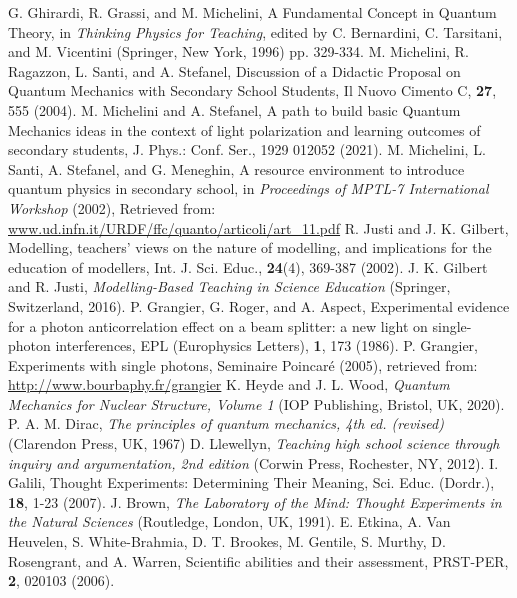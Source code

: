 \documentclass[twocolumn,secnumarabic,amssymb, nobibnotes, aps, prd, nofootinbib]{revtex4-2}
\begin{document}
\begin{thebibliography}{99}
 G. Ghirardi, R. Grassi, and M. Michelini, A Fundamental Concept in Quantum Theory, in \textit{Thinking Physics for Teaching}, edited by C. Bernardini, C. Tarsitani, and M. Vicentini (Springer, New York, 1996) pp. 329-334.
 M. Michelini, R. Ragazzon, L. Santi, and A. Stefanel, Discussion of a Didactic Proposal on Quantum Mechanics with Secondary School Students, Il Nuovo Cimento C, \textbf{27}, 555 (2004).
 M. Michelini and A. Stefanel, A path to build basic Quantum Mechanics ideas in the context of light polarization and learning outcomes of secondary students, J. Phys.: Conf. Ser., 1929 012052 (2021).
 M. Michelini, L. Santi, A. Stefanel, and G. Meneghin, A resource environment to introduce quantum physics in secondary school, in \textit{Proceedings of MPTL-7 International Workshop} (2002), Retrieved from: \url{www.ud.infn.it/URDF/ffc/quanto/articoli/art_11.pdf}
 R. Justi and J. K. Gilbert, Modelling, teachers' views on the nature of modelling, and implications for the education of modellers, Int. J. Sci. Educ., \textbf{24}(4), 369-387 (2002).
 J. K. Gilbert and R. Justi, \textit{Modelling-Based Teaching in Science Education} (Springer, Switzerland, 2016).
 P. Grangier, G. Roger, and A. Aspect, Experimental evidence for a photon anticorrelation effect on a beam splitter: a new light on single-photon interferences, EPL (Europhysics Letters), \textbf{1}, 173 (1986).
 P. Grangier, Experiments with single photons, Seminaire Poincar\'{e} (2005), retrieved from: \url{http://www.bourbaphy.fr/grangier}
 K. Heyde and J. L. Wood, \textit{Quantum Mechanics for Nuclear Structure, Volume 1} (IOP Publishing, Bristol, UK, 2020).
 P. A. M. Dirac, \textit{The principles of quantum mechanics, 4th ed. (revised)} (Clarendon Press, UK, 1967)
 D. Llewellyn, \textit{Teaching high school science through inquiry and argumentation, 2nd edition} (Corwin Press, Rochester, NY, 2012).
 I. Galili, Thought Experiments: Determining Their Meaning, Sci. Educ. (Dordr.), \textbf{18}, 1-23 (2007).
 J. Brown, \textit{The Laboratory of the Mind: Thought Experiments in the Natural Sciences} (Routledge, London, UK, 1991).
 E. Etkina, A. Van Heuvelen, S. White-Brahmia, D. T. Brookes, M. Gentile, S. Murthy, D. Rosengrant, and A. Warren, Scientific abilities and their assessment, PRST-PER, \textbf{2}, 020103 (2006).

\end{thebibliography}
\end{document}
